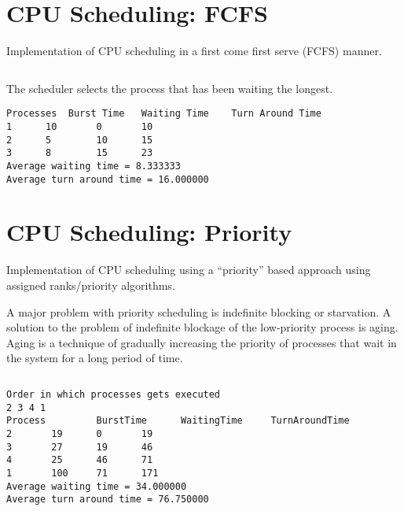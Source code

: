 \section{CPU Scheduling: FCFS}
\label{sec:cpu-scheduling}

Implementation of CPU scheduling in a first come first serve (FCFS) manner.

\inputminted[linenos,autogobble]{c}{code/fcfs.c}

The scheduler selects the process that has been waiting the longest.

\begin{lstlisting}[style=output]
Processes  Burst Time   Waiting Time    Turn Around Time
1	   10		0		10
2	   5		10		15
3	   8		15		23
Average waiting time = 8.333333
Average turn around time = 16.000000
\end{lstlisting}

\section{CPU Scheduling: Priority}
\label{sec:cpu-scheduling-priority}

Implementation of CPU scheduling using a ``priority'' based approach using assigned ranks/priority algorithms.

A major problem with priority scheduling is indefinite blocking or starvation. A solution to the problem of indefinite blockage of the low-priority process is aging. Aging is a technique of gradually increasing the priority of processes that wait in the system for a long period of time.

\inputminted[linenos,autogobble]{c}{code/priority.c}

\begin{lstlisting}[style=output]
Order in which processes gets executed
2 3 4 1 
Process         BurstTime      WaitingTime     TurnAroundTime
2		19		0		19
3		27		19		46
4		25		46		71
1		100		71		171
Average waiting time = 34.000000
Average turn around time = 76.750000
\end{lstlisting}
